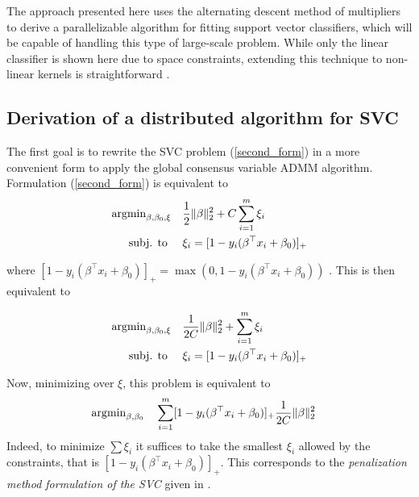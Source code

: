 \documentclass[11pt]{article}
\begin{document}
The approach presented here uses the alternating descent method of multipliers to derive 
a parallelizable algorithm for fitting support vector classifiers, which will be capable 
of handling this type of large-scale problem.
While only the linear classifier is shown here due to space constraints, 
extending this technique to non-linear kernels is straightforward \cite{forero2010consensus}.


\subsection{Derivation of a distributed algorithm for SVC}

The first goal is to rewrite the SVC problem (\ref{second_form}) in a more convenient form to apply 
the global consensus variable ADMM algorithm. Formulation (\ref{second_form}) is equivalent to \\

\begin{equation*} 
\begin{aligned}
    \operatorname{argmin}_{\beta, \beta_0, \xi} \quad &   \frac{1}{2} \|\beta\|_2^2 + C\sum_{i=1}^m \xi_i\\
    \textrm{subj. to } \quad & \xi_i =  [1 - y_i (\beta^\top x_i + \beta_0)]_+
\end{aligned}
\end{equation*}

where  $[1 - y_i (\beta^\top x_i + \beta_0)]_+ = \max(0, 1 - y_i (\beta^\top x_i + \beta_0))$ . This is then equivalent to

\begin{equation*} 
\begin{aligned}
        \operatorname{argmin}_{\beta, \beta_0, \xi} \quad & \frac{1}{2C} \|\beta\|_2^2 + \sum_{i=1}^m \xi_i\\
        \textrm{subj. to } \quad & \xi_i =  [1 - y_i (\beta^\top x_i + \beta_0)]_+
\end{aligned}
\end{equation*}

Now, minimizing over $\xi$, this problem is equivalent to
\begin{equation} \label{third_formulation}
\begin{aligned}
        \operatorname{argmin}_{\beta, \beta_0} \quad 
        &  \sum_{i=1}^m [1 - y_i (\beta^\top x_i + \beta_0)]_+ \frac{1}{2C} \|\beta\|_2^2 
\end{aligned}
\end{equation}
Indeed, to minimize $\sum \xi_i$ it suffices to take the smallest $\xi_i$ allowed by the constraints,
that is $[1 - y_i (\beta^\top x_i + \beta_0)]_+$. This corresponds to the \emph{penalization method
formulation of the SVC} given in \cite{hastie2009elements}. \\
\end{document}
